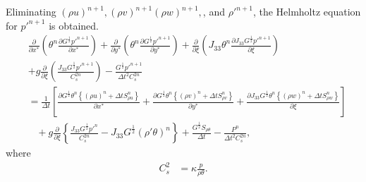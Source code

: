 Eliminating $(\rho u)^{n+1}, (\rho v)^{n+1} (\rho w)^{n+1}, $, and $\rho'^{n+1}$, the Helmholtz equation for $p'^{n+1}$ is obtained.
\begin{align}
  & \frac{\partial}{\partial x^*}\left(\theta^n\frac{\partial G^{\frac{1}{2}}p'^{n+1}}{\partial x^*}\right)
  + \frac{\partial}{\partial y^*}\left(\theta^n\frac{\partial G^{\frac{1}{2}}p'^{n+1}}{\partial y^*}\right)
  + \frac{\partial}{\partial \xi}\left(J_{33}\theta^n\frac{\partial J_{33}G^{\frac{1}{2}}p'^{n+1}}{\partial \xi}\right) \nonumber\\&
  + g \frac{\partial}{\partial \xi} \left(\frac{J_{33}G^{\frac{1}{2}}p'^{n+1}}{C_s^{2n}}\right)
  - \frac{G^{\frac{1}{2}}p'^{n+1}}{\Delta t^2 C_s^{2n}} \nonumber\\
  &=
  \frac{1}{\Delta t}\left[
      \frac{\partial G^{\frac{1}{2}}\theta^n\left\{(\rho u)^n + \Delta t S_{\rho u}^n\right\}}{\partial x^*}
    + \frac{\partial G^{\frac{1}{2}}\theta^n\left\{(\rho v)^n + \Delta t S_{\rho v}^n\right\}}{\partial y^*}
    + \frac{\partial J_{33}G^{\frac{1}{2}}\theta^n\left\{(\rho w)^n + \Delta t S_{\rho w}^n\right\}}{\partial \xi}
    \right] \nonumber\\&\;\;\;
  + g \frac{\partial}{\partial \xi}\left\{\frac{J_{33}G^{\frac{1}{2}}p'^n}{C_s^{2n}}-J_{33}G^{\frac{1}{2}}(\rho'\theta)^n\right\}
  + \frac{G^{\frac{1}{2}} S_{\rho\theta}}{\Delta t}
  - \frac{P^n}{\Delta t^2 C_s^{2n}},
\end{align}
where
\begin{align}
  C_s^2 &= \kappa\frac{p}{\rho\theta}.
\end{align}

